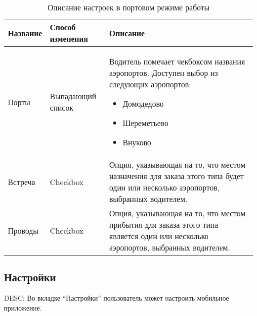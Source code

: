       \begin{table}
          \begin{center}
          \caption {Описание настроек в портовом режиме работы}
          \label{table:driver_app_robot_tab_table_port_mode}
          \setlength{\extrarowheight}{2mm}
          \begin{tabular}{|p{4cm}|p{3cm}|p{8cm}|}

            \hline     \textbf{Название}&\textbf{Способ изменения}&\textbf{Описание} \\ [2mm]

            \hline   Порты & Выпадающий список & Водитель помечает чекбоксом названия аэропортов. Доступен выбор из следующих аэропортов: \begin{itemize} \item Домодедово \item Шереметьево \item Внуково \end{itemize} \\ [2mm]

            \hline   Встреча & Checkbox & Опция, указывающая на то, что местом назначения для заказа этого типа будет один или несколько аэропортов, выбранных водителем. \\ [2mm]

            \hline   Проводы & Checkbox & Опция, указывающая на то, что местом прибытия для заказа этого типа является один или несколько аэропортов, выбранных водителем. \\ [2mm]

            \hline
          \end{tabular}
          \end{center}
      \end{table}

  \subsection{Настройки} \label{driver_app_settings_tab}

    DESC: Во вкладке “Настройки” пользователь может настроить мобильное приложение.

